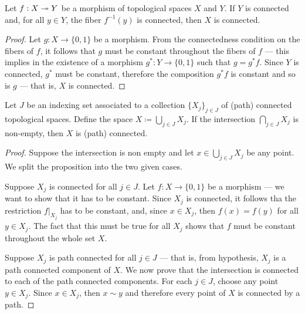 \begin{proposition}
\label{prop:connectivity-quotients}
Let \(f: X \twoheadrightarrow Y\) be a morphism of topological spaces \(X\) and \(Y\). If
\(Y\) is connected and, for all \(y \in Y\), the fiber \(f^{-1}(y)\) is
connected, then \(X\) is connected.
\end{proposition}

\begin{proof}
Let \(g: X \to \{0, 1\}\) be a morphism. From the connectedness condition on the
fibers of \(f\), it follows that \(g\) must be constant throughout the fibers of
\(f\) --- this implies in the existence of a morphism \(g^{*}: Y \to \{0, 1\}\)
such that \(g = g^{*} f\). Since \(Y\) is connected, \(g^{*}\) must be constant,
therefore the composition \(g^{*} f\) is constant and so is \(g\) --- that is,
\(X\) is connected.
\end{proof}

\begin{proposition}
\label{prop:union-path-connected}
Let \(J\) be an indexing set associated to a collection \(\{X_{j}\}_{j \in J}\)
of (path) connected topological spaces. Define the space \(X \coloneq \bigcup_{j
\in J} X_j\). If the intersection \(\bigcap_{j \in J} X_j\) is non-empty, then
\(X\) is (path) connected.
\end{proposition}

\begin{proof}
Suppose the intersection is non empty and let \(x \in \bigcup_{j \in J}
X_j\) be any point. We split the proposition into the two given cases.

Suppose \(X_j\) is connected for all \(j \in J\). Let \(f: X \to \{0, 1\}\) be a
morphism --- we want to show that it has to be constant. Since \(X_j\) is
connected, it follows tha the restriction \(f|_{X_j}\) has to be constant, and,
since \(x \in X_j\), then \(f(x) = f(y)\) for all \(y \in X_j\). The fact that
this must be true for all \(X_j\) shows that \(f\) must be constant throughout
the whole set \(X\).

Suppose \(X_j\) is path connected for all \(j \in J\) --- that is, from
hypothesis, \(X_j\) is a path connected component of \(X\). We now prove that
the intersection is connected to each of the path connected components. For each
\(j \in J\), choose any point \(y \in X_j\). Since \(x \in X_j\), then \(x \sim
y\) and therefore every point of \(X\) is connected by a path.
\end{proof}






